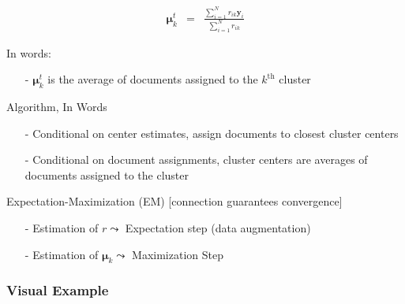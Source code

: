 \documentclass{beamer}
\numberwithin{equation}{section}
\begin{document}
\begin{frame}

\begin{eqnarray}
\boldsymbol{\mu}^{t}_{k} & = & \frac{\sum_{i=1}^{N} r_{ik} \boldsymbol{y}_{i} }{\sum_{i=1}^{N} r_{ik} } \nonumber 
\end{eqnarray}

In words:
\begin{itemize}
\item[-] $\boldsymbol{\mu}^{t}_k$ is the average of documents assigned to the $k^{\text{th}}$ cluster
\end{itemize}

\alert{Algorithm, In Words}
\begin{itemize}
\item[-] Conditional on center estimates, assign documents to closest cluster centers
\item[-] Conditional on document assignments, cluster centers are averages of documents assigned to the cluster
\end{itemize}

\alert{Expectation-Maximization} (EM) [connection guarantees convergence]
\begin{itemize}
\item[-] Estimation of $r \leadsto$ Expectation step (data augmentation)
\item[-] Estimation of $\boldsymbol{\mu}_k \leadsto$ Maximization Step 
\end{itemize}


\end{frame}

\begin{frame}
\frametitle{Visual Example} 




\end{frame}
\end{document}
